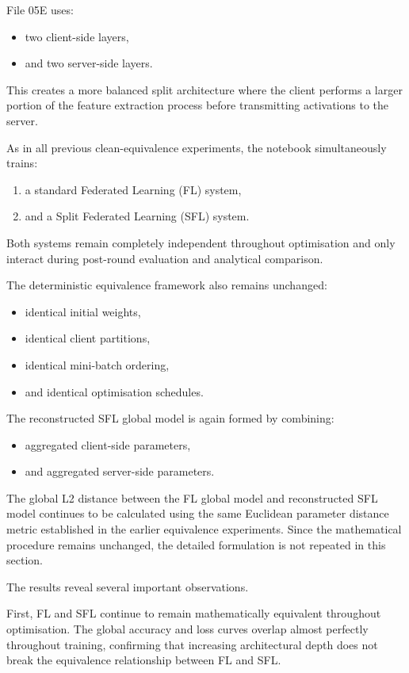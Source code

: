 File 05E uses:
\begin{itemize}
    \item two client-side layers,
    \item and two server-side layers.
\end{itemize}

This creates a more balanced split architecture where the client performs a larger portion of the feature extraction process before transmitting activations to the server.

As in all previous clean-equivalence experiments, the notebook simultaneously trains:
\begin{enumerate}
    \item a standard Federated Learning (FL) system,
    \item and a Split Federated Learning (SFL) system.
\end{enumerate}

Both systems remain completely independent throughout optimisation and only interact during post-round evaluation and analytical comparison.

The deterministic equivalence framework also remains unchanged:
\begin{itemize}
    \item identical initial weights,
    \item identical client partitions,
    \item identical mini-batch ordering,
    \item and identical optimisation schedules.
\end{itemize}

The reconstructed SFL global model is again formed by combining:
\begin{itemize}
    \item aggregated client-side parameters,
    \item and aggregated server-side parameters.
\end{itemize}

The global L2 distance between the FL global model and reconstructed SFL model continues to be calculated using the same Euclidean parameter distance metric established in the earlier equivalence experiments. Since the mathematical procedure remains unchanged, the detailed formulation is not repeated in this section.

The results reveal several important observations.

First, FL and SFL continue to remain mathematically equivalent throughout optimisation. The global accuracy and loss curves overlap almost perfectly throughout training, confirming that increasing architectural depth does not break the equivalence relationship between FL and SFL.

